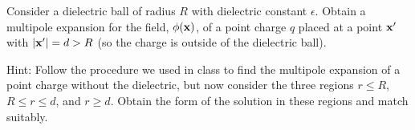 \newcommand{\eps}{\epsilon}
\newcommand{\vx}{\vb{x}}
\newcommand{\phix}{\phi(\vx)}
\newcommand{\dcx}{\dd[3]{x}}
\newcommand{\dcxp}{\dd[3]{x'}}
\newcommand{\rhox}{\rho(\vx)}
\newcommand{\rhoxp}{\rho(\vx')}
\newcommand{\rhopxp}{\rho'(\vx')}
\newcommand{\xh}{\vec{\hat{x}}}
\newcommand{\absx}{\abs{\vx}}
\newcommand{\absxp}{\abs{\vx'}}

\newcommand{\Ylm}{Y_{l m}}
\newcommand{\qlm}{q_{l m}}
\newcommand{\Plm}{P_l^m}
\newcommand{\tht}{\theta}
\newcommand{\cost}{\cos\tht}
\newcommand{\vph}{\varphi}
\newcommand{\tv}{(\tht, \vph)}
\newcommand{\tvp}{(\tht', \vph')}
\newcommand{\Gxxp}{G(\vx, \vx')}
\newcommand{\Gpxxp}{G'(\vx, \vx')}
\newcommand{\Gdxxp}{G_D(\vx, \vx')}
\newcommand{\qplm}{q'_{l m}}

\newcommand{\lap}{\nabla^2}
\newcommand{\evphi}{\ev{\phi}}
\newcommand{\evphix}{\evphi\!(\vx)}
\newcommand{\rhof}{\rho_f}
\newcommand{\evrhof}{\ev{\rhof}}
\newcommand{\fe}{\frac{1}{\eps}}
\newcommand{\tif}{\text{if }}
\newcommand{\Al}{A_l}
\newcommand{\Bl}{B_l}
\newcommand{\Cl}{C_l}

\newcommand{\intoi}{\int_0^\infty}
\newcommand{\intono}{\int_{-1}^{1}}
\newcommand{\intotp}{\int_0^{2\pi}}
\newcommand{\drp}{\dd{r'}}
\newcommand{\dctp}{\dd{(\cost')}}
\newcommand{\dvp}{\dd{\vph'}}

\newcommand{\Ylotv}{Y_{l 0}\tv}
\newcommand{\dr}{\dd{r}}
\newcommand{\dct}{\dd{(\cost)}}
\newcommand{\ddv}{\dd{\vph}}

\newcommand{\Alm}{A_{l m}}
\newcommand{\Blm}{B_{l m}}
\newcommand{\Clm}{C_{l m}}
\newcommand{\Pl}{P_l}
\newcommand{\Plct}{\Pl(\cost)}
\newcommand{\Plctp}{\Pl(\cost')}
\newcommand{\alp}{\alpha}
\newcommand{\rtp}{(r, \tht, \phi)}
\newcommand{\phirtp}{\phi\rtp}
\newcommand{\qlo}{q_{l 0}}
\newcommand{\qplo}{q'_{l 0}}
\newcommand{\qpplm}{q''_{l m}}
\newcommand{\qpplo}{q''_{l 0}}

\newcommand{\vD}{\vb{D}}
\newcommand{\evD}{\ev{\vD}}
\newcommand{\nh}{\vb{\hat{n}}}
\newcommand{\vE}{\vb{E}}
\newcommand{\evE}{\ev{\vE}}
\newcommand{\Er}{E_r}
\newcommand{\evEr}{\ev{\Er}}
\newcommand{\rh}{\vb{\hat{r}}}

\newcommand{\dint}{\displaystyle \int}
\newcommand{\dsum}{\displaystyle \sum}

\begin{statement}{} \label{1}
	Consider a dielectric ball of radius $R$ with dielectric constant $\eps$.  Obtain a multipole expansion for the field, $\phix$, of a point charge $q$ placed at a point $\vx'$ with $\abs{\vx'} = d > R$ (so the charge is outside of the dielectric ball).
	
	Hint: Follow the procedure we used in class to find the multipole expansion of a point charge without the dielectric, but now consider the three regions $r \leq R$, $R \leq r \leq d$, and $r \geq d$.  Obtain the form of the solution in these regions and match suitably.
\end{statement}

